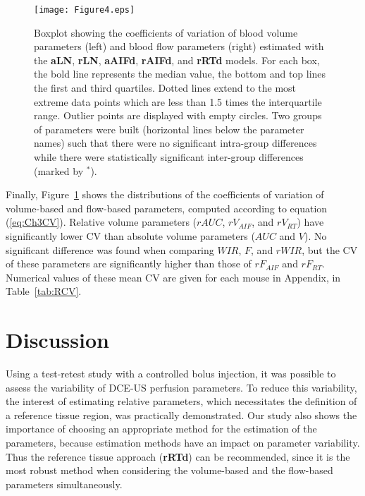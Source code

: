 \begin{figure}[ht]
  \centering
  \texttt{[image: Figure4.eps]}
  \caption{Boxplot showing the coefficients of variation of blood volume parameters (left) and blood flow parameters (right) estimated with the \textbf{aLN}, \textbf{rLN}, \textbf{aAIFd}, \textbf{rAIFd}, and \textbf{rRTd} models. For each box, the bold line represents the median value, the bottom and top lines the first and third quartiles. Dotted lines extend to the most extreme data points which are less than 1.5 times the interquartile range. Outlier points are displayed with empty circles. Two groups of parameters were built (horizontal lines below the parameter names) such that there were no significant intra-group differences while there were statistically significant inter-group differences (marked by $^{*}$).}
\label{fig:CV}
\end{figure}

Finally, Figure~\ref{fig:CV} shows the distributions of the coefficients of variation of volume-based and flow-based parameters, computed according to equation (\ref{eq:Ch3CV}). Relative volume parameters ($rAUC$, $rV_{AIF}$, and $rV_{RT}$) have significantly lower CV than absolute volume parameters ($AUC$ and $V$). No significant difference was found when comparing $WIR$, $F$, and $rWIR$, but the CV of these parameters are significantly higher than those of $rF_{AIF}$ and $rF_{RT}$.
Numerical values of these mean CV are given for each mouse in Appendix, in Table~\ref{tab:RCV}.


\section{Discussion}
Using a test-retest study with a controlled bolus injection, it was possible to assess the variability of DCE-US perfusion parameters. To reduce this variability, the interest of estimating relative parameters, which necessitates the definition of a reference tissue region, was practically demonstrated. Our study also shows the importance of choosing an appropriate method for the estimation of the parameters, because estimation methods have an impact on parameter variability. Thus the reference tissue approach (\textbf{rRTd}) can be recommended, since it is the most robust method when considering the volume-based and the flow-based parameters simultaneously.

